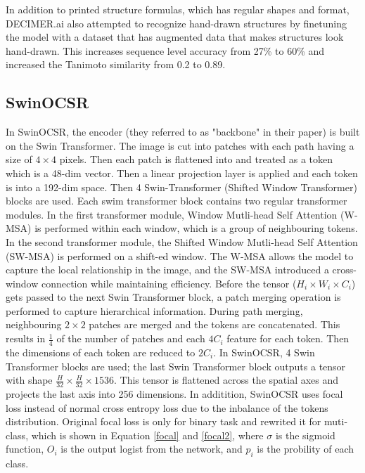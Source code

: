 \documentclass[12pt]{article}
\begin{document}
In addition to printed structure formulas, which has regular shapes and format, DECIMER.ai also attempted to recognize hand-drawn structures by finetuning the model with a dataset that has augmented data that makes structures look hand-drawn. This increases sequence level accuracy from 27\% to 60\% and increased the Tanimoto similarity from 0.2 to 0.89.
\autocite{decimer} 

\subsection{SwinOCSR}
In SwinOCSR, the encoder (they referred to as "backbone" in their paper) is built on the Swin Transformer. The image is cut into patches with each path having a size of $4 \times 4$ pixels. Then each patch is flattened into and treated as a token which is a 48-dim vector. Then a linear projection layer is applied and each token is into a 192-dim space. 
Then 4 Swin-Transformer (Shifted Window Transformer) \autocite{swin_tran} blocks are used. Each swim transformer block contains two regular transformer modules. In the first transformer module, Window Mutli-head Self Attention (W-MSA) is performed within each window, which is a group of neighbouring tokens. In the second transformer module, the Shifted Window Mutli-head Self Attention (SW-MSA) is performed on a shift-ed window. The W-MSA allows the model to capture the local relationship in the image, and the SW-MSA introduced a cross-window connection while maintaining efficiency. Before the tensor ($H_i \times W_i \times C_i$) gets passed to the next Swin Transformer block, a patch merging operation is performed to capture hierarchical information. During path merging, neighbouring $2 \times 2$ patches are merged and the tokens are concatenated. This results in $\frac{1}{4}$ of the number of patches and each $4C_i$ feature for each token. Then the dimensions of each token are reduced to $2C_i$. In SwinOCSR, 4 Swin Transformer blocks are used; the last Swin Transformer block outputs a tensor with shape $\frac{H}{32} \times \frac{H}{32} \times 1536$. This tensor is flattened across the spatial axes and projects the last axis into 256 dimensions. 
In additition, SwinOCSR uses focal loss \autocite{lin_focal_2018} instead of normal cross entropy loss due to the inbalance of the tokens distribution. \cite{swinocsr} Original focal loss is only for binary task and \autocite{swinocsr} rewrited it for muti-class, which is shown in Equation \ref{focal} and \ref{focal2}, where $\sigma$ is the sigmoid function, $O_i$ is the output logist from the network, and $p_i$ is the probility of each class. 
\end{document}
